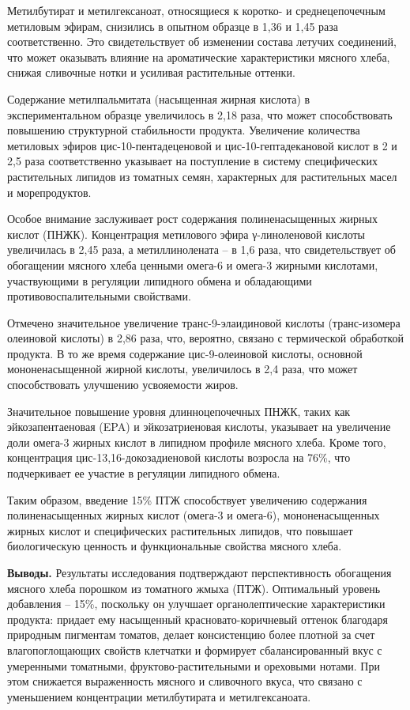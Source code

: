 \begin{multicols}{2}
Метилбутират и метилгексаноат, относящиеся к коротко- и среднецепочечным
метиловым эфирам, снизились в опытном образце в 1,36 и 1,45 раза
соответственно. Это свидетельствует об изменении состава летучих
соединений, что может оказывать влияние на ароматические характеристики
мясного хлеба, снижая сливочные нотки и усиливая растительные оттенки.

Содержание метилпальмитата (насыщенная жирная кислота) в
экспериментальном образце увеличилось в 2,18 раза, что может
способствовать повышению структурной стабильности продукта. Увеличение
количества метиловых эфиров цис-10-пентадеценовой и
цис-10-гептадекановой кислот в 2 и 2,5 раза соответственно указывает на
поступление в систему специфических растительных липидов из томатных
семян, характерных для растительных масел и морепродуктов.

Особое внимание заслуживает рост содержания полиненасыщенных жирных
кислот (ПНЖК). Концентрация метилового эфира γ-линоленовой кислоты
увеличилась в 2,45 раза, а метиллинолената -- в 1,6 раза, что
свидетельствует об обогащении мясного хлеба ценными омега-6 и омега-3
жирными кислотами, участвующими в регуляции липидного обмена и
обладающими противовоспалительными свойствами.

Отмечено значительное увеличение транс-9-элаидиновой кислоты
(транс-изомера олеиновой кислоты) в 2,86 раза, что, вероятно, связано с
термической обработкой продукта. В то же время содержание
цис-9-олеиновой кислоты, основной мононенасыщенной жирной кислоты,
увеличилось в 2,4 раза, что может способствовать улучшению усвояемости
жиров.

Значительное повышение уровня длинноцепочечных ПНЖК, таких как
эйкозапентаеновая (EPA) и эйкозатриеновая кислоты, указывает на
увеличение доли омега-3 жирных кислот в липидном профиле мясного хлеба.
Кроме того, концентрация цис-13,16-докозадиеновой кислоты возросла на
76\%, что подчеркивает ее участие в регуляции липидного обмена.

Таким образом, введение 15\% ПТЖ способствует увеличению содержания
полиненасыщенных жирных кислот (омега-3 и омега-6), мононенасыщенных
жирных кислот и специфических растительных липидов, что повышает
биологическую ценность и функциональные свойства мясного хлеба.

{\bfseries Выводы.} Результаты исследования подтверждают перспективность
обогащения мясного хлеба порошком из томатного жмыха (ПТЖ). Оптимальный
уровень добавления -- 15\%, поскольку он улучшает органолептические
характеристики продукта: придает ему насыщенный красновато-коричневый
оттенок благодаря природным пигментам томатов, делает консистенцию более
плотной за счет влагопоглощающих свойств клетчатки и формирует
сбалансированный вкус с умеренными томатными, фруктово-растительными и
ореховыми нотами. При этом снижается выраженность мясного и сливочного
вкуса, что связано с уменьшением концентрации метилбутирата и
метилгексаноата.


\end{multicols}

